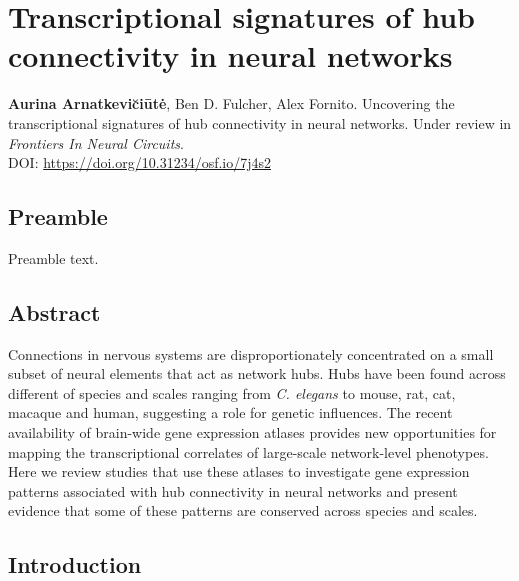 \chapter{Transcriptional signatures of hub \\connectivity in neural networks}
\label{ch:Chapter3}



\textbf{Aurina Arnatkevi\u{c}i\={u}t\.{e}},
Ben D. Fulcher,
Alex Fornito.
Uncovering the transcriptional signatures of hub connectivity in neural networks. Under review in \textit{
Frontiers In Neural Circuits}.\\
DOI: \url{https://doi.org/10.31234/osf.io/7j4s2} %


\section*{Preamble}
Preamble text.

\newpage

\section*{Abstract}
Connections in nervous systems are disproportionately concentrated on a small subset of neural elements that act as network hubs. Hubs have been found across different of species and scales ranging from \textit{C. elegans} to mouse, rat, cat, macaque and human, suggesting a role for genetic influences. The recent availability of brain-wide gene expression atlases provides new opportunities for mapping the transcriptional correlates of large-scale network-level phenotypes. Here we review studies that use these atlases to investigate gene expression patterns associated with hub connectivity in neural networks and present evidence that some of these patterns are conserved across species and scales.

\section{Introduction}

